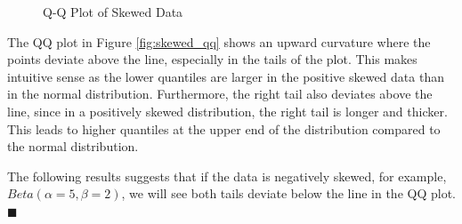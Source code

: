 \documentclass{article}
\begin{document}
\begin{figure}[h!]
    \centering
    \caption{Q-Q Plot of Skewed Data}
\end{figure}

The QQ plot in Figure \ref{fig:skewed_qq} shows an upward curvature where the points deviate above the line, especially in the tails of the plot. This makes intuitive sense as the lower quantiles are larger in the positive skewed data than in the normal distribution. Furthermore, the right tail also deviates above the line, since in a positively skewed distribution, the right tail is longer and thicker. This leads to higher quantiles at the upper end of the distribution compared to the normal distribution.

The following results suggests that if the data is negatively skewed, for example, $Beta(\alpha = 5, \beta = 2)$, we will see both tails deviate below the line in the QQ plot. $\blacksquare$
\end{document}
